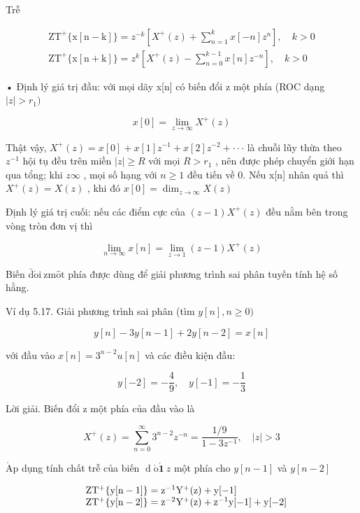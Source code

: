 \documentclass[
  10
]{article}
\begin{document}
Trễ

\[
\begin{array}{l} \mathrm {ZT^ {+} \{x[n- k]\}} = z ^ {- k} [ X ^ {+} (z) + \sum_ {n = 1} ^ {k} x [ - n ] z ^ {n} ], \quad k > 0 \\ \mathrm {ZT^ {+} \{x[n+ k]\}} = z ^ {k} [ X ^ {+} (z) - \sum_ {n = 0} ^ {k - 1} x [ n ] z ^ {- n} ], \quad k > 0 \end{array}
\]

• Định lý giá trị đầu: với mọi dãy x{[}n{]} có biến đổi z một phía (ROC
dạng \(| z | > r _ { 1 } )\)

\[
x [ 0 ] = \lim _ {z \to \infty} X ^ {+} (z)\tag{5.19}
\]

Thật vậy,
\(X ^ { + } ( z ) = x [ 0 ] + x [ 1 ] z ^ { - 1 } + x [ 2 ] z ^ { - 2 } + \cdot \cdot \cdot\)
là chuỗi lũy thừa theo \(z ^ { - 1 }\) hội tụ đều trên miền
\(| z | \geq R\) với mọi \(R > r _ { 1 }\) , nên được phép chuyển giới
hạn qua tổng; khi \(z  \infty\) , mọi số hạng với \(n \geq 1\) đều tiến
về 0. Nếu x{[}n{]} nhân quả thì \(X ^ { + } ( z ) = X ( z )\) , khi đó
\(x [ 0 ] = \dim _ { z \to \infty } X ( z )\)

Định lý giá trị cuối: nếu các điểm cực của \(( z - 1 ) X ^ { + } ( z )\)
đều nằm bên trong vòng tròn đơn vị thì

\[
\lim _ {n \to \infty} x [ n ] = \lim _ {z \to 1} (z - 1) X ^ {+} (z)
\]

Biến \(\mathrm { \bar { d } \acute { o } i \ z m \hat { o } t }\) phía
được dùng để giải phương trình sai phân tuyến tính hệ số hằng.

Ví dụ 5.17. Giải phương trình sai phân (tìm \(y [ n ] , n \geq 0 )\)

\[
y [ n ] - 3 y [ n - 1 ] + 2 y [ n - 2 ] = x [ n ]
\]

với đầu vào \(x [ n ] = 3 ^ { n - 2 } u [ n ]\) và các điều kiện đầu:

\[
y [ - 2 ] = - \frac {4}{9}, \quad y [ - 1 ] = - \frac {1}{3}
\]

Lời giải. Biến đổi z một phía của đầu vào là

\[
X ^ {+} (z) = \sum_ {n = 0} ^ {\infty} 3 ^ {n - 2} z ^ {- n} = \frac {1 / 9}{1 - 3 z ^ {- 1}}, \quad | z | > 3
\]

\(\mathrm { { \acute { A } p } }\) dụng tính chất trễ của biến
\(\operatorname { d } \acute { \boldsymbol { \mathrm { o } } } \acute { \boldsymbol { 1 } } ~ z\)
một phía cho \(y [ n - 1 ]\) và \(y [ n - 2 ]\)

\[
\begin{array}{r l} & {\mathrm {ZT^ {+} \{y[n- 1]\} = z^ {- 1} Y^ {+} (z) + y[- 1]}} \\ & {\mathrm {ZT^ {+} \{y[n- 2]\} = z^ {- 2} Y^ {+} (z) + z^ {- 1} y[- 1] + y[- 2]}} \end{array}
\]
\end{document}
